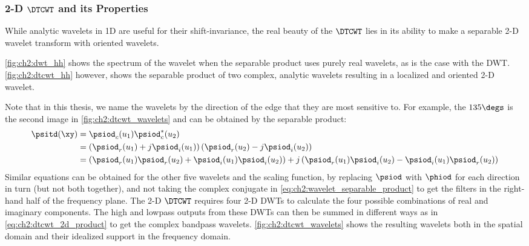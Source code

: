 \subsubsection{2-D $\DTCWT$ and its Properties}
  While analytic wavelets in 1D are useful for their shift-invariance, the real
  beauty of the $\DTCWT$ lies in its ability to make a separable 2-D wavelet
  transform with oriented wavelets.

  \autoref{fig:ch2:dwt_hh} shows the spectrum of
  the wavelet when the separable product uses purely real wavelets, as is the
  case with the DWT\@. \autoref{fig:ch2:dtcwt_hh} however, shows the separable
  product of two complex, analytic wavelets resulting in a localized and
  oriented 2-D wavelet.

  Note that in this thesis, we name the wavelets by the direction of the edge
  that they are most sensitive to.
  For example, the $135\degs$ is the second image in \autoref{fig:ch2:dtcwt_wavelets} and
  can be obtained by the separable product:
  \begin{align}
    \psitd(\xy) &= \psiod_c(u_1) \psiod_c^*(u_2) \label{eq:ch2:wavelet_separable_product}\\
              &= \left(\psiod_r(u_1) + j\psiod_i(u_1)\right)
                 \left(\psiod_r(u_2) - j\psiod_i(u_2)\right) \\
              &= \left(\psiod_r(u_1)\psiod_r(u_2) + \psiod_i(u_1)\psiod_i(u_2)\right)
                +j \left(\psiod_r(u_1)\psiod_i(u_2) - \psiod_i(u_1)\psiod_r(u_2)\right)
                \label{eq:ch2:dtcwt_2d_product}
  \end{align}
  Similar equations can be obtained for the other five wavelets and the scaling
  function, by replacing $\psiod$ with $\phiod$ for each direction in turn (but not both
  together), and not taking the complex conjugate
  in \eqref{eq:ch2:wavelet_separable_product} to get the filters in the
  right-hand half of the frequency plane. The 2-D $\DTCWT$ requires four 2-D
  DWTs to calculate the four possible combinations of real and imaginary
  components. The high and lowpass outputs from these DWTs can then be summed in
  different ways as in \eqref{eq:ch2:dtcwt_2d_product} to get the complex
  bandpass wavelets. \autoref{fig:ch2:dtcwt_wavelets} shows the resulting
  wavelets both in the spatial domain and their idealized support in the
  frequency domain.

